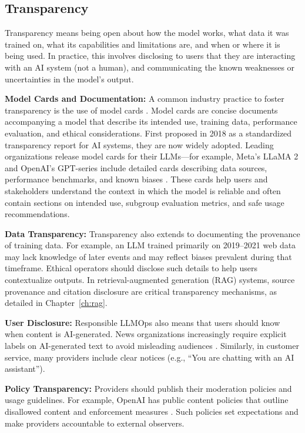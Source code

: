 \subsection{Transparency}

Transparency means being open about how the model works, what data it was trained on, what its capabilities and limitations are, and when or where it is being used. In practice, this involves disclosing to users that they are interacting with an AI system (not a human), and communicating the known weaknesses or uncertainties in the model's output.

\textbf{Model Cards and Documentation:} A common industry practice to foster transparency is the use of model cards \cite{iapp2023}. Model cards are concise documents accompanying a model that describe its intended use, training data, performance evaluation, and ethical considerations. First proposed in 2018 as a standardized transparency report for AI systems, they are now widely adopted. Leading organizations release model cards for their LLMs---for example, Meta's LLaMA 2 and OpenAI's GPT-series include detailed cards describing data sources, performance benchmarks, and known biases \cite{iapp2023}. These cards help users and stakeholders understand the context in which the model is reliable and often contain sections on intended use, subgroup evaluation metrics, and safe usage recommendations.

\textbf{Data Transparency:} Transparency also extends to documenting the provenance of training data. For example, an LLM trained primarily on 2019--2021 web data may lack knowledge of later events and may reflect biases prevalent during that timeframe. Ethical operators should disclose such details to help users contextualize outputs. In retrieval-augmented generation (RAG) systems, source provenance and citation disclosure are critical transparency mechanisms, as detailed in Chapter~\ref{ch:rag}.

\textbf{User Disclosure:} Responsible LLMOps also means that users should know when content is AI-generated. News organizations increasingly require explicit labels on AI-generated text to avoid misleading audiences \cite{niemanlab2023}. Similarly, in customer service, many providers include clear notices (e.g., ``You are chatting with an AI assistant'').

\textbf{Policy Transparency:} Providers should publish their moderation policies and usage guidelines. For example, OpenAI has public content policies that outline disallowed content and enforcement measures \cite{openai2023}. Such policies set expectations and make providers accountable to external observers.

